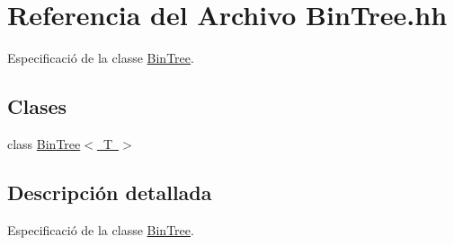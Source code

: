 \hypertarget{_bin_tree_8hh}{}\section{Referencia del Archivo Bin\+Tree.\+hh}
\label{_bin_tree_8hh}


Especificació de la classe \mbox{\hyperlink{class_bin_tree}{Bin\+Tree}}.  


\subsection*{Clases}
\begin{DoxyCompactItemize}
\item 
class \mbox{\hyperlink{class_bin_tree}{Bin\+Tree$<$ T $>$}}
\end{DoxyCompactItemize}


\subsection{Descripción detallada}
Especificació de la classe \mbox{\hyperlink{class_bin_tree}{Bin\+Tree}}. 

